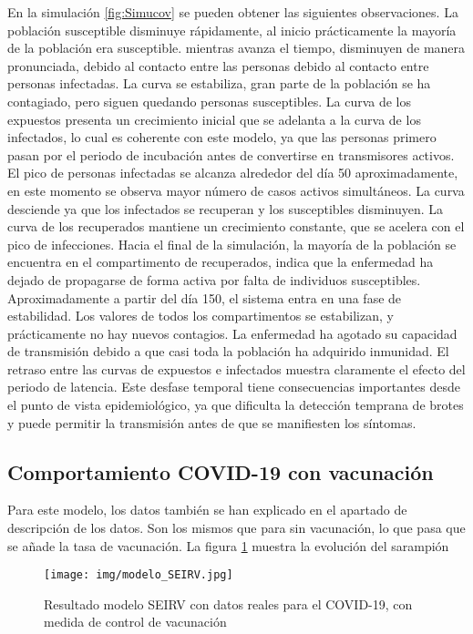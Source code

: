 En la simulación \ref{fig:Simucov} se pueden obtener las siguientes observaciones. La población susceptible disminuye rápidamente, al inicio prácticamente la mayoría de la población era susceptible. mientras avanza el tiempo, disminuyen de manera pronunciada, debido al contacto entre las personas debido al contacto entre personas infectadas. La curva se estabiliza, gran parte de la población se ha contagiado, pero siguen quedando personas susceptibles.
La curva de los expuestos presenta un crecimiento inicial que se adelanta a la curva de los infectados, lo cual es coherente con este modelo, ya que las personas primero pasan por el periodo de incubación antes de convertirse en transmisores activos. El pico de personas infectadas se alcanza alrededor del día 50 aproximadamente, en este momento se observa mayor número de casos activos simultáneos. La curva desciende ya que los infectados se recuperan y los susceptibles disminuyen.
La curva de los recuperados mantiene un crecimiento constante, que se acelera con el pico de infecciones. Hacia el final de la simulación, la mayoría de la población se encuentra en el compartimento de recuperados, indica que la enfermedad ha dejado de propagarse de forma activa por falta de individuos susceptibles.
Aproximadamente a partir del día 150, el sistema entra en una fase de estabilidad. Los valores de todos los compartimentos se estabilizan, y prácticamente no hay nuevos contagios.  La enfermedad ha agotado su capacidad de transmisión debido a que casi toda la población ha adquirido inmunidad.
El retraso entre las curvas de expuestos e infectados muestra claramente el efecto del periodo de latencia. Este desfase temporal tiene consecuencias importantes desde el punto de vista epidemiológico, ya que dificulta la detección temprana de brotes y puede permitir la transmisión antes de que se manifiesten los síntomas.

\subsection{Comportamiento COVID-19 con vacunación}
Para este modelo, los datos también se han explicado en el apartado de descripción de los datos. Son los mismos que para sin vacunación, lo que pasa que se añade la tasa de vacunación. La figura \ref{fig:Simucov vacunacion} muestra la evolución del sarampión

\begin{figure}[H]
    \centering
    \texttt{[image: img/modelo\_SEIRV.jpg]}
    \caption{Resultado modelo SEIRV con datos reales para el COVID-19, con medida de control de vacunación}
    \label{fig:Simucov vacunacion}
    \vspace{0.5cm} %
\end{figure}

